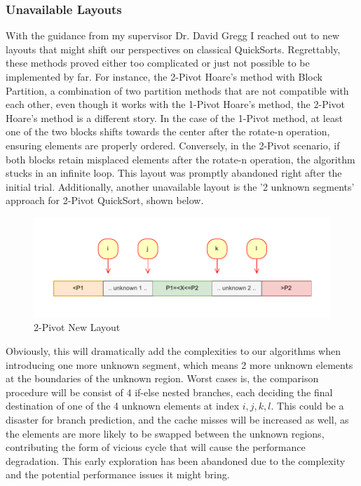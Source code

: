 \documentclass[a4paper,oneside,12pt]{book}
\begin{document}
\subsubsection{Unavailable Layouts}
With the guidance from my supervisor Dr. David Gregg I reached out to new layouts that might shift our perspectives on classical QuickSorts. Regrettably, these methods proved either too complicated or just not possible to be implemented by far.
For instance, the 2-Pivot Hoare's method with Block Partition, a combination of two partition methods that are not compatible with each other, even though it works with the 1-Pivot Hoare's method, the 2-Pivot Hoare's method is a different story.
In the case of the 1-Pivot method, at least one of the two blocks shifts towards the center after the rotate-n operation, ensuring elements are properly ordered. Conversely, in the 2-Pivot scenario, if both blocks retain misplaced elements after the rotate-n operation, the algorithm stucks in an infinite loop.
This layout was promptly abandoned right after the initial trial. Additionally, another unavailable layout is the '2 unknown segments' approach for 2-Pivot QuickSort, shown below.

\begin{figure}[H]
    \hypertarget{fig:2pivotnewlayout}{}
    \caption{2-Pivot New Layout}
    \centering
    \hspace*{-0.10\textwidth}
    \includegraphics[width=1.2\textwidth]{2pivot_new_layout.drawio.pdf}
\end{figure}

Obviously, this will dramatically add the complexities to our algorithms when introducing one more unknown segment, which means 2 more unknown elements at the boundaries of the unknown region. Worst cases is, the comparison procedure will be consist of 4 if-else nested branches, each deciding the final destination of one of the 4 unknown elements at index $i, j, k, l$.
This could be a disaster for branch prediction, and the cache misses will be increased as well, as the elements are more likely to be swapped between the unknown regions, contributing the form of vicious cycle that will cause the performance degradation. This early exploration has been abandoned due to the complexity and the potential performance issues it might bring.
\end{document}
